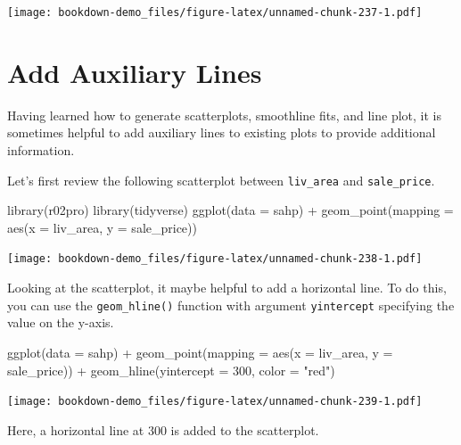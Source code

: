 \documentclass[
]{book}
\newenvironment{Shaded}{\begin{snugshade}}{\end{snugshade}}
\newcommand{\AttributeTok}[1]{\textcolor[rgb]{0.77,0.63,0.00}{#1}}
\newcommand{\DecValTok}[1]{\textcolor[rgb]{0.00,0.00,0.81}{#1}}
\newcommand{\FunctionTok}[1]{\textcolor[rgb]{0.00,0.00,0.00}{#1}}
\newcommand{\NormalTok}[1]{#1}
\newcommand{\SpecialCharTok}[1]{\textcolor[rgb]{0.00,0.00,0.00}{#1}}
\newcommand{\StringTok}[1]{\textcolor[rgb]{0.31,0.60,0.02}{#1}}
\begin{document}
\texttt{[image: bookdown-demo\_files/figure-latex/unnamed-chunk-237-1.pdf]}

\hypertarget{add-auxiliary}{%
\section{Add Auxiliary Lines}\label{add-auxiliary}}

Having learned how to generate scatterplots, smoothline fits, and line plot, it is sometimes helpful to add auxiliary lines to existing plots to provide additional information.

Let's first review the following scatterplot between \texttt{liv\_area} and \texttt{sale\_price}.

\begin{Shaded}
\begin{Highlighting}[]
\FunctionTok{library}\NormalTok{(r02pro)}
\FunctionTok{library}\NormalTok{(tidyverse)}
\FunctionTok{ggplot}\NormalTok{(}\AttributeTok{data =}\NormalTok{ sahp) }\SpecialCharTok{+} \FunctionTok{geom\_point}\NormalTok{(}\AttributeTok{mapping =} \FunctionTok{aes}\NormalTok{(}\AttributeTok{x =}\NormalTok{ liv\_area, }\AttributeTok{y =}\NormalTok{ sale\_price))}
\end{Highlighting}
\end{Shaded}

\texttt{[image: bookdown-demo\_files/figure-latex/unnamed-chunk-238-1.pdf]}

Looking at the scatterplot, it maybe helpful to add a horizontal line. To do this, you can use the \texttt{geom\_hline()} function with argument \texttt{yintercept} specifying the value on the y-axis.

\begin{Shaded}
\begin{Highlighting}[]
\FunctionTok{ggplot}\NormalTok{(}\AttributeTok{data =}\NormalTok{ sahp) }\SpecialCharTok{+} \FunctionTok{geom\_point}\NormalTok{(}\AttributeTok{mapping =} \FunctionTok{aes}\NormalTok{(}\AttributeTok{x =}\NormalTok{ liv\_area, }\AttributeTok{y =}\NormalTok{ sale\_price)) }\SpecialCharTok{+} \FunctionTok{geom\_hline}\NormalTok{(}\AttributeTok{yintercept =} \DecValTok{300}\NormalTok{, }\AttributeTok{color =} \StringTok{"red"}\NormalTok{)}
\end{Highlighting}
\end{Shaded}

\texttt{[image: bookdown-demo\_files/figure-latex/unnamed-chunk-239-1.pdf]}

Here, a horizontal line at 300 is added to the scatterplot.
\end{document}

